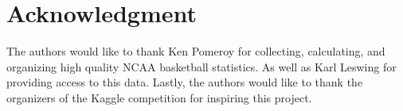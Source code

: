 \documentclass[conference]{IEEEtran}
\begin{document}
{%
\section*{Acknowledgment}
The authors would like to thank Ken Pomeroy for collecting, calculating, and organizing high quality NCAA basketball statistics. As well as Karl Leswing for providing access to this data. Lastly, the authors would like to thank the organizers of the Kaggle competition for inspiring this project.





%
%


\newpage
\onecolumn
}
\end{document}
